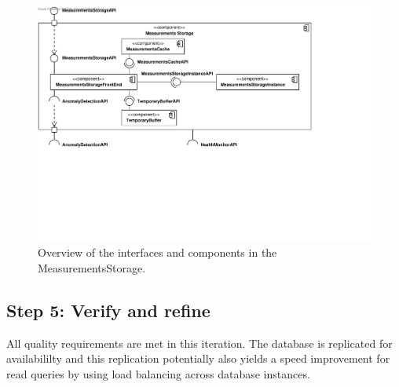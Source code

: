 \begin{figure}[H]
	\begin{centering}
		\includegraphics[width=\textwidth]{figs/add-it4-interfaces.pdf}
		\caption{Overview of the interfaces and components in the
		MeasurementsStorage.}
		\label{fig:it4/interfaces}
	\end{centering}
\end{figure}

\subsection{Step 5: Verify and refine}
\label{add:it4/verification}

\npar All quality requirements are met in this iteration. The database is
replicated for availabililty and this replication potentially also yields a
speed improvement for read queries by using load balancing across database
instances.
